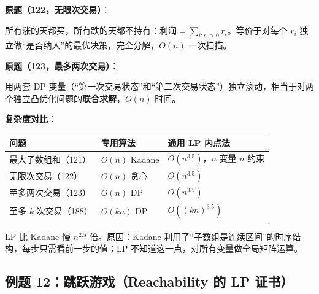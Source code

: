 \documentclass[12pt, a4paper]{ctexart}
\begin{document}
\begin{blackboard}
\textbf{原题（122，无限次交易）}：

所有涨的天都买，所有跌的天都不持有：$\text{利润} = \sum_{i: r_i > 0} r_i$。等价于对每个 $r_i$ 独立做``是否纳入''的最优决策，完全分解，$O(n)$ 一次扫描。

\textbf{原题（123，最多两次交易）}：

用两套 DP 变量（``第一次交易状态''和``第二次交易状态''）独立滚动，相当于对两个独立凸优化问题的\textbf{联合求解}，$O(n)$ 时间。

\textbf{复杂度对比}：

\begin{center}
\begin{tabular}{lll}
\toprule
问题 & 专用算法 & 通用 LP 内点法 \\
\midrule
最大子数组和（121） & $O(n)$ Kadane & $O(n^{3.5})$，$n$ 变量 $n$ 约束 \\
无限次交易（122） & $O(n)$ 贪心 & $O(n^{3.5})$ \\
至多两次交易（123） & $O(n)$ DP & $O(n^{3.5})$ \\
至多 $k$ 次交易（188） & $O(kn)$ DP & $O((kn)^{3.5})$ \\
\bottomrule
\end{tabular}
\end{center}

LP 比 Kadane 慢 $n^{2.5}$ 倍。原因：Kadane 利用了``子数组是连续区间''的时序结构，每步只需看前一步的值；LP 不知道这一点，对所有变量做全局矩阵运算。

\end{blackboard}

\subsection{例题 12：跳跃游戏（Reachability 的 LP 证书）}
\end{document}

